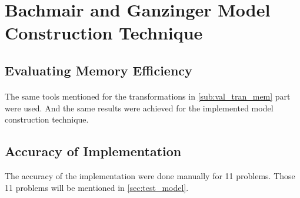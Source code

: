 \section{Bachmair and Ganzinger Model Construction Technique}
\subsection{Evaluating Memory Efficiency}
\paragraph{}
The same tools mentioned for the transformations in \ref{sub:val_tran_mem} part were used. And the same results were achieved for the implemented model construction technique.


\begin{comment}
\subsection{Complexity of the algorithm}
\end{comment}


\subsection{Accuracy of Implementation}
The accuracy of the implementation were done manually for 11 problems. Those 11 problems will be mentioned in \ref{sec:test_model}. 